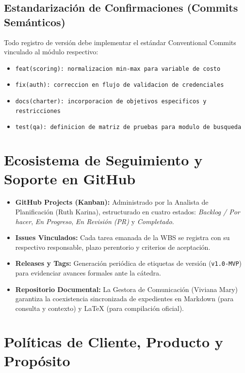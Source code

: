 \documentclass[11pt,a4paper]{article}
\begin{document}
\subsection{Estandarización de Confirmaciones (Commits Semánticos)}
Todo registro de versión debe implementar el estándar Conventional Commits vinculado al módulo respectivo:
\begin{itemize}[leftmargin=*]
    \item \texttt{feat(scoring): normalizacion min-max para variable de costo}
    \item \texttt{fix(auth): correccion en flujo de validacion de credenciales}
    \item \texttt{docs(charter): incorporacion de objetivos especificos y restricciones}
    \item \texttt{test(qa): definicion de matriz de pruebas para modulo de busqueda}
\end{itemize}

\section{Ecosistema de Seguimiento y Soporte en GitHub}
\begin{itemize}[leftmargin=*]
    \item \textbf{GitHub Projects (Kanban):} Administrado por la Analista de Planificación (Ruth Karina), estructurado en cuatro estados: \textit{Backlog / Por hacer}, \textit{En Progreso}, \textit{En Revisión (PR)} y \textit{Completado}.
    \item \textbf{Issues Vinculados:} Cada tarea emanada de la WBS se registra con su respectivo responsable, plazo perentorio y criterios de aceptación.
    \item \textbf{Releases y Tags:} Generación periódica de etiquetas de versión (\texttt{v1.0-MVP}) para evidenciar avances formales ante la cátedra.
    \item \textbf{Repositorio Documental:} La Gestora de Comunicación (Viviana Mary) garantiza la coexistencia sincronizada de expedientes en Markdown (para consulta y contexto) y LaTeX (para compilación oficial).
\end{itemize}

\clearpage


\section{Políticas de Cliente, Producto y Propósito}
\end{document}
